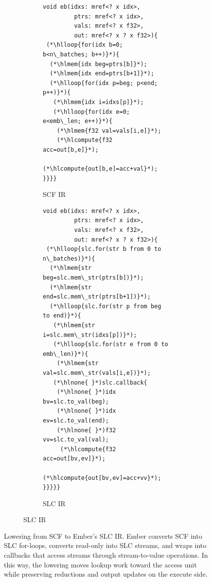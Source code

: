 \begin{figure}
    \noindent
    \begin{subfigure}[]{1\columnwidth}
        \begin{subfigure}[t]{0.47\columnwidth} %
            \begin{lstlisting}[xleftmargin=1.5em]
void eb(idxs: mref<? x idx>,
         ptrs: mref<? x idx>,
         vals: mref<? x f32>,
         out: mref<? x ? x f32>){
 (*\hlloop{for(idx b=0; b<n\_batches; b++)}*){
  (*\hlmem{idx beg=ptrs[b]}*);
  (*\hlmem{idx end=ptrs[b+1]}*);
  (*\hlloop{for(idx p=beg; p<end; p++)}*){
   (*\hlmem{idx i=idxs[p]}*);
   (*\hlloop{for(idx e=0; e<emb\_len; e++)}*){
    (*\hlmem{f32 val=vals[i,e]}*);
    (*\hlcompute{f32 acc=out[b,e]}*);
    (*\hlcompute{out[b,e]=acc+val}*); }}}}
            \end{lstlisting}
            \vspace{3.2em}
            \caption{SCF IR}
            \label{fig:ember-scf-to-slc-input}
        \end{subfigure}
        \begin{subfigure}[t]{0.635\columnwidth} %
            \begin{lstlisting}[xleftmargin=1.5em]
void eb(idxs: mref<? x idx>,
         ptrs: mref<? x idx>,
         vals: mref<? x f32>,
         out: mref<? x ? x f32>){
 (*\hlloop{slc.for(str b from 0 to n\_batches)}*){
  (*\hlmem{str beg=slc.mem\_str(ptrs[b])}*);
  (*\hlmem{str end=slc.mem\_str(ptrs[b+1])}*);
  (*\hlloop{slc.for(str p from beg to end)}*){
   (*\hlmem{str i=slc.mem\_str(idxs[p])}*);
   (*\hlloop{slc.for(str e from 0 to emb\_len)}*){
    (*\hlmem{str val=slc.mem\_str(vals[i,e])}*);
   (*\hlnone{ }*)slc.callback{
    (*\hlnone{ }*)idx bv=slc.to_val(beg);
    (*\hlnone{ }*)idx ev=slc.to_val(end);
    (*\hlnone{ }*)f32 vv=slc.to_val(val);
     (*\hlcompute{f32 acc=out[bv,ev]}*);
     (*\hlcompute{out[bv,ev]=acc+vv}*); }}}}}
            \end{lstlisting}
            \caption{SLC IR}
            \label{fig:ember-scf-to-slc-output}
        \end{subfigure}
    \end{subfigure}
    \caption[Lowering from SCF to Ember SLC IR.]{Lowering from SCF to Ember's SLC IR. Ember converts SCF  into SLC for-loops, converts read-only  into SLC streams, and wraps  into callbacks that access streams through stream-to-value operations. In this way, the lowering moves lookup work toward the access unit while preserving reductions and output updates on the execute side.}
    \label{fig:ember-scf-to-slc-lowering}
\end{figure}
